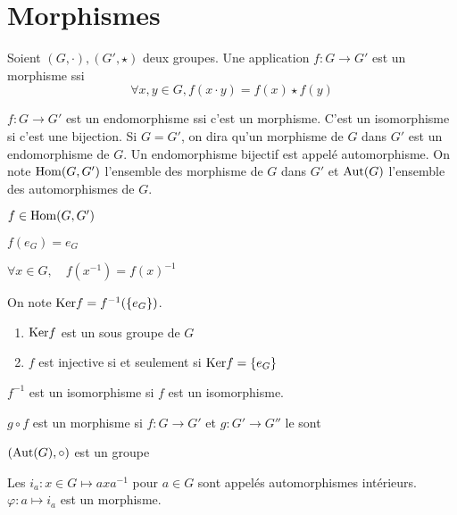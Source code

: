 \section{Morphismes}

\begin{dfn}
    Soient $(G,\cdot), (G',\star)$ deux groupes. Une application $f:G\to G'$ est un morphisme ssi \[
        \forall x, y\in G, f(x\cdot y)=f(x)\star f(y)
    \]
\end{dfn}

\begin{notation}
    $f:G\to G'$ est un endomorphisme ssi c'est un morphisme. C'est un isomorphisme si c'est une bijection. Si $G=G'$, on dira qu'un morphisme de $G$ dans $G'$ est un endomorphisme de $G$. Un endomorphisme bijectif est appelé automorphisme. On note $\mathrm{Hom} (G, G')$ l'ensemble des morphisme de $G$ dans $G'$ et $\mathrm{Aut}(G)$ l'ensemble des automorphismes de $G$. 
\end{notation}

\begin{prop}
    \Hyp $f\in\mathrm{Hom}(G, G')$
    \begin{concenum}
    \item $f(e_G)=e_G$
    \item $\forall x\in G, \quad f(x^{-1})=f(x)^{-1}$
    \item On note $\mathrm{Ker} f=f^{-1}(\{e_G\})$. \begin{enumerate}
            \item $\mathrm{Ker} f$ est un sous groupe de $G$
            \item $f$ est injective si et seulement si $\mathrm{Ker} f=\{e_G\}$
        \end{enumerate}
    \item $f^{-1}$ est un isomorphisme si $f$ est un isomorphisme.
    \item $g\circ f$ est un morphisme si $f:G\to G'$ et $g:G'\to G''$ le sont
    \end{concenum}
\end{prop}

\begin{csq}
    $(\mathrm{Aut}(G), \circ)$ est un groupe
\end{csq}

\begin{csq}
    Les $i_a:x\in G\longmapsto axa^{-1}$ pour $a\in G$ sont appelés automorphismes intérieurs. $\varphi:a\longmapsto i_a$ est un morphisme.
\end{csq}

